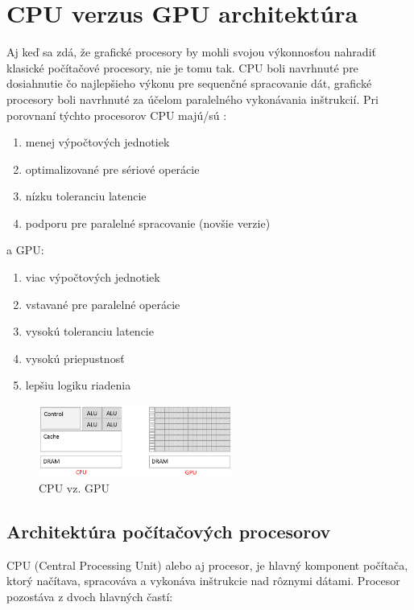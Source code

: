 \documentclass[conference]{IEEEtran}
\begin{document}
\section{CPU verzus GPU architektúra}

Aj keď sa zdá, že grafické procesory by mohli svojou výkonnosťou nahradiť klasické počítačové procesory, nie je tomu tak. CPU boli navrhnuté pre dosiahnutie čo najlepšieho výkonu pre sequenčné spracovanie dát, grafické procesory boli navrhnuté za účelom paralelného vykonávania inštrukcií. Pri porovnaní týchto procesorov CPU majú/sú \cite{gpuRowe}:

\begin{enumerate}
	\item{menej výpočtových jednotiek}
	\item{optimalizované pre sériové operácie}
	\item{nízku toleranciu latencie}
	\item{podporu pre paralelné spracovanie (novšie verzie)}
\end{enumerate}

a GPU:

\begin{enumerate}
	\item{viac výpočtových jednotiek}
	\item{vstavané pre paralelné operácie}
	\item{vysokú toleranciu latencie}
	\item{vysokú priepustnosť}
	\item{lepšiu logiku riadenia}
\end{enumerate}


\begin{figure}[!h]
\centering
\includegraphics[width=2.5in]{img/CPU-GPU-3}
\caption{CPU vz. GPU}
\end{figure}


\subsection{Architektúra počítačových procesorov}

CPU (Central Processing Unit) alebo aj procesor, je hlavný komponent počítača, ktorý načítava, spracováva a vykonáva inštrukcie nad rôznymi dátami. Procesor pozostáva z dvoch hlavných častí:
\end{document}
